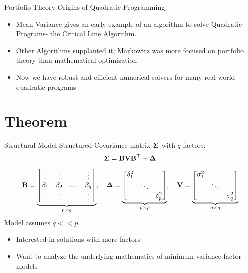 \documentclass[11pt,leqno]{beamer}
\begin{document}
\begin{frame}{Portfolio Theory Origins of Quadratic Programming}
\begin{itemize}
\item Mean-Variance gives an early example of an algorithm to solve Quadratic Programs- the Critical Line Algorithm.
\item Other Algorithms  supplanted it; Markowitz was more focused on portfolio theory than mathematical optimization
\item Now we have robust and efficient numerical solvers for many real-world quadratic programs
\end{itemize}
\end{frame}





\section{Theorem}

\begin{frame}{Structural Model}
Structured Covariance matrix $\mathbf{\Sigma}$ with $q$ factors:
\begin{equation}
\mathbf{\Sigma} = \mathbf{B}\mathbf{V} \mathbf{B}^\top + \bm{\Delta}
\end{equation}
\[\mathbf{B} = \underbrace{\begin{bmatrix}
 \vdots & \vdots & & \vdots\\
 \beta_1 & \beta_2 & \ldots & \beta_{q} \\
  \vdots & \vdots & & \vdots
\end{bmatrix}}_{p \times q}, \quad \bm{\Delta} = \underbrace{\begin{bmatrix}
\delta_1^2 & & \\
& \ddots & \\
& & \delta_p^2
\end{bmatrix}}_{ p \times p}, 
\quad \mathbf{V} = \underbrace{\begin{bmatrix}
\sigma_1^2 & & \\
& \ddots & \\
& & \sigma_q^2
\end{bmatrix}}_{ q \times q}
\]
Model assumes $q << p$. \\
\begin{itemize}
\item Interested in solutions with more factors
\item Want to analyze the underlying mathematics of minimum variance factor models
\end{itemize}
\end{frame}
\end{document}

